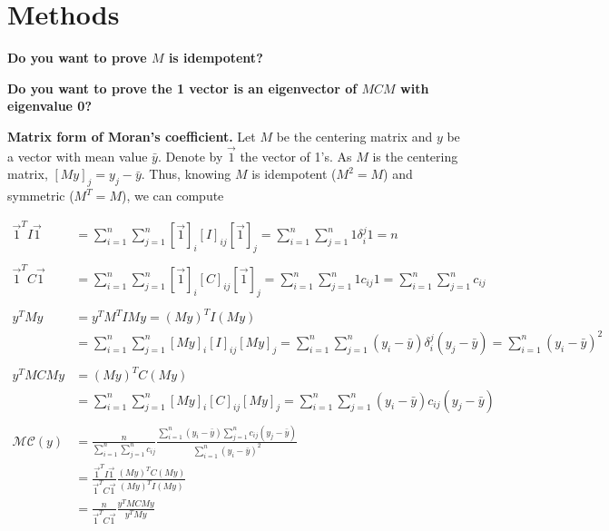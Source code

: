 \documentclass[12pt]{article}
\begin{document}
\section*{Methods}

{\bf Do you want to prove $M$ is idempotent?}

{\bf Do you want to prove the 1 vector is an eigenvector of $MCM$ with eigenvalue 0?}

{\bf Matrix form of Moran's coefficient.}
Let $M$ be the centering matrix and $y$ be a vector with mean value $\bar y$. Denote by $\vec 1$ the vector of 1's. As $M$ is the centering matrix, $[My]_j=y_j-\bar y$. Thus, knowing $M$ is idempotent ($M^2=M$) and symmetric ($M^T=M$), we can compute

\begin{align*}
	\vec 1^T I\vec 1 & =\sum_{i=1}^n\sum_{j=1}^n[\vec 1]_i[I]_{ij}[\vec 1]_j=\sum_{i=1}^n\sum_{j=1}^n1\delta_i^j1=n\\
	\\
	\vec 1^T C\vec 1 & =\sum_{i=1}^n\sum_{j=1}^n[\vec 1]_i[C]_{ij}[\vec 1]_j=\sum_{i=1}^n\sum_{j=1}^n1c_{ij}1=\sum_{i=1}^n\sum_{j=1}^nc_{ij}\\
	\\
	y^TMy & =y^TM^TIMy=(My)^TI(My)\\
	 & =\sum_{i=1}^n\sum_{j=1}^n[My]_i[I]_{ij}[My]_j=\sum_{i=1}^n\sum_{j=1}^n(y_i-\bar y)\delta_i^j(y_j-\bar y)=\sum_{i=1}^n(y_i-\bar y)^2\\
	\\
	y^TMCMy & =(My)^TC(My)\\
	 & =\sum_{i=1}^n\sum_{j=1}^n[My]_i[C]_{ij}[My]_j=\sum_{i=1}^n\sum_{j=1}^n(y_i-\bar y)c_{ij}(y_j-\bar y)\\
	\\
	\mathcal{MC}(y) & =\frac{n}{\sum_{i=1}^n\sum_{j=1}^nc_{ij}}\frac{\sum_{i=1}^n(y_i-\bar y)\sum_{j=1}^nc_{ij}(y_j-\bar y)}{\sum_{i=1}^n(y_i-\bar y)^2}\\
	 & =\frac{\vec 1^T I\vec 1}{\vec 1^T C\vec 1}\frac{(My)^TC(My)}{(My)^TI(My)}\\
	 & =\frac{n}{\vec 1^T C\vec 1}\frac{y^TMCMy}{y^TMy}
\end{align*}
\end{document}
